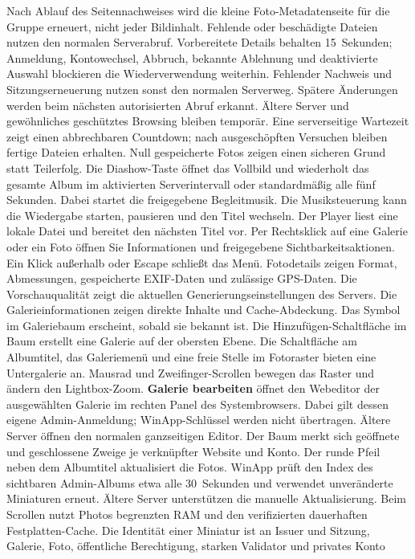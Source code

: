 \documentclass[11pt,a4paper]{article}
\newcommand{\ui}[1]{\textbf{#1}}
\begin{document}
Nach Ablauf des Seitennachweises wird die kleine Foto-Metadatenseite für die
Gruppe erneuert, nicht jeder Bildinhalt. Fehlende oder beschädigte Dateien
nutzen den normalen Serverabruf. Vorbereitete Details behalten 15~Sekunden;
Anmeldung, Kontowechsel, Abbruch, bekannte Ablehnung und deaktivierte Auswahl
blockieren die Wiederverwendung weiterhin. Fehlender Nachweis und
Sitzungserneuerung nutzen sonst den normalen Serverweg. Spätere Änderungen
werden beim nächsten autorisierten Abruf erkannt.
Ältere Server und gewöhnliches geschütztes
Browsing bleiben temporär. Eine serverseitige Wartezeit zeigt einen
abbrechbaren Countdown; nach ausgeschöpften Versuchen bleiben fertige Dateien
erhalten. Null gespeicherte Fotos zeigen einen sicheren Grund statt Teilerfolg.
Die Diashow-Taste öffnet das Vollbild und wiederholt das gesamte Album im
aktivierten Serverintervall oder standardmäßig alle fünf Sekunden. Dabei
startet die freigegebene Begleitmusik. Die Musiksteuerung kann die Wiedergabe
starten, pausieren und den Titel wechseln. Der Player liest eine lokale Datei
und bereitet den nächsten Titel vor.
Per Rechtsklick auf eine Galerie oder ein Foto öffnen Sie Informationen und
freigegebene Sichtbarkeitsaktionen. Ein Klick außerhalb oder Escape schließt
das Menü. Fotodetails zeigen Format, Abmessungen, gespeicherte EXIF-Daten und
zulässige GPS-Daten. Die Vorschauqualität zeigt die aktuellen
Generierungseinstellungen des Servers. Die Galerieinformationen zeigen
direkte Inhalte und Cache-Abdeckung. Das Symbol im Galeriebaum erscheint,
sobald sie bekannt
ist. Die Hinzufügen-Schaltfläche im Baum erstellt eine Galerie auf der
obersten Ebene. Die Schaltfläche am Albumtitel, das Galeriemenü und eine
freie Stelle im Fotoraster bieten eine Untergalerie an. Mausrad und
Zweifinger-Scrollen bewegen das Raster und ändern den Lightbox-Zoom.
\ui{Galerie bearbeiten} öffnet den Webeditor der ausgewählten Galerie im
rechten Panel des Systembrowsers. Dabei gilt dessen eigene Admin-Anmeldung;
WinApp-Schlüssel werden nicht übertragen. Ältere Server öffnen den normalen
ganzseitigen Editor.
Der Baum merkt sich geöffnete und geschlossene Zweige je verknüpfter Website
und Konto. Der runde Pfeil neben dem Albumtitel aktualisiert die Fotos.
WinApp prüft den Index des sichtbaren Admin-Albums etwa alle 30~Sekunden
und verwendet unveränderte Miniaturen erneut. Ältere Server unterstützen
die manuelle Aktualisierung.
Beim Scrollen nutzt Photos begrenzten RAM und den verifizierten dauerhaften
Festplatten-Cache. Die Identität einer Miniatur ist an Issuer und Sitzung,
Galerie, Foto, öffentliche Berechtigung, starken Validator und privates Konto
\end{document}
